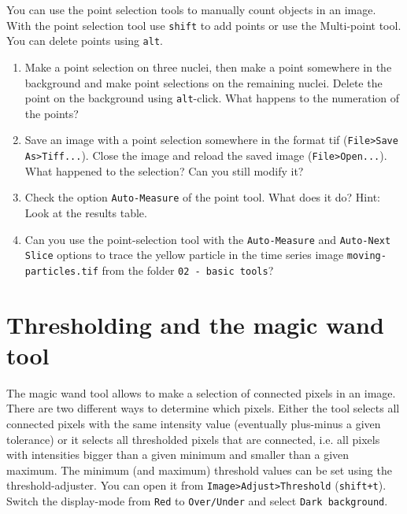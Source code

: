 You can use the point selection tools to manually count objects in an image. With the point selection tool use \texttt{shift} to add points or use the Multi-point tool. You can delete points using \texttt{alt}.

\begin{enumerate}
\item Make a point selection on three nuclei, then make a point somewhere in the background and make point selections on the remaining nuclei. Delete the point on the background using \texttt{alt}-click. What happens to the numeration of the points?

\fbox{
	\begin{minipage}{\linewidth}
		\hfill\vspace{2cm}
	\end{minipage}
	}
	
\item Save an image with a point selection somewhere in the format tif (\texttt{File>Save As>Tiff...}). Close the image and reload the saved image (\texttt{File>Open...}). What happened to the selection? Can you still modify it?

\fbox{
	\begin{minipage}{\linewidth}
		\hfill\vspace{2cm}
	\end{minipage}
	}
	
\item Check the option \texttt{Auto-Measure} of the point tool. What does it do? Hint: Look at the results table.

\fbox{
	\begin{minipage}{\linewidth}
		\hfill\vspace{2cm}
	\end{minipage}
	}
	
\item Can you use the point-selection tool with the \texttt{Auto-Measure} and \texttt{Auto-Next Slice} options to trace the yellow particle in the time series image \texttt{moving-particles.tif} from the folder \texttt{02 - basic tools}?
\end{enumerate}

\section{Thresholding and the magic wand tool}

The magic wand tool allows to make a selection of connected pixels in an image. There are two different ways to determine which pixels. Either the tool selects all connected pixels with the same intensity value (eventually plus-minus a given tolerance) or it selects all thresholded pixels that are connected, i.e. all pixels with intensities bigger than a given minimum and smaller than a given maximum. The minimum (and maximum) threshold values can be set using the threshold-adjuster. You can open it from \texttt{Image>Adjust>Threshold} (\texttt{shift+t}). Switch the display-mode from \texttt{Red} to \texttt{Over/Under} and select \texttt{Dark background}.

